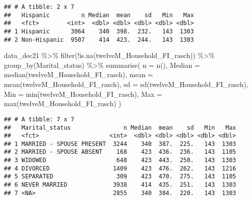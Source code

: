 \documentclass[
]{article}
\newenvironment{Shaded}{\begin{snugshade}}{\end{snugshade}}
\newcommand{\AttributeTok}[1]{\textcolor[rgb]{0.77,0.63,0.00}{#1}}
\newcommand{\FunctionTok}[1]{\textcolor[rgb]{0.00,0.00,0.00}{#1}}
\newcommand{\NormalTok}[1]{#1}
\newcommand{\SpecialCharTok}[1]{\textcolor[rgb]{0.00,0.00,0.00}{#1}}
\begin{document}
\begin{verbatim}
## # A tibble: 2 x 7
##   Hispanic         n Median  mean    sd   Min   Max
##   <fct>        <int>  <dbl> <dbl> <dbl> <dbl> <dbl>
## 1 Hispanic      3064    340  398.  232.   143  1303
## 2 Non-Hispanic  9507    414  423.  244.   143  1303
\end{verbatim}

\begin{Shaded}
\begin{Highlighting}[]
\NormalTok{data\_dec21 }\SpecialCharTok{\%\textgreater{}\%} \FunctionTok{filter}\NormalTok{(}\SpecialCharTok{!}\FunctionTok{is.na}\NormalTok{(twelveM\_Household\_FI\_rasch)) }\SpecialCharTok{\%\textgreater{}\%} 
\FunctionTok{group\_by}\NormalTok{(Marital\_status) }\SpecialCharTok{\%\textgreater{}\%}
  \FunctionTok{summarise}\NormalTok{(}
    \AttributeTok{n =} \FunctionTok{n}\NormalTok{(),}
    \AttributeTok{Median =} \FunctionTok{median}\NormalTok{(twelveM\_Household\_FI\_rasch),}
    \AttributeTok{mean =} \FunctionTok{mean}\NormalTok{(twelveM\_Household\_FI\_rasch),}
    \AttributeTok{sd =} \FunctionTok{sd}\NormalTok{(twelveM\_Household\_FI\_rasch),}
    \AttributeTok{Min =} \FunctionTok{min}\NormalTok{(twelveM\_Household\_FI\_rasch),}
    \AttributeTok{Max =} \FunctionTok{max}\NormalTok{(twelveM\_Household\_FI\_rasch)}
\NormalTok{  )}
\end{Highlighting}
\end{Shaded}

\begin{verbatim}
## # A tibble: 7 x 7
##   Marital_status               n Median  mean    sd   Min   Max
##   <fct>                    <int>  <dbl> <dbl> <dbl> <dbl> <dbl>
## 1 MARRIED - SPOUSE PRESENT  3244    340  387.  225.   143  1303
## 2 MARRIED - SPOUSE ABSENT    168    423  436.  236.   143  1105
## 3 WIDOWED                    648    423  443.  250.   143  1303
## 4 DIVORCED                  1409    423  476.  262.   143  1216
## 5 SEPARATED                  309    423  470.  275.   143  1105
## 6 NEVER MARRIED             3938    414  435.  251.   143  1303
## 7 <NA>                      2855    340  384.  220.   143  1303
\end{verbatim}
\end{document}
